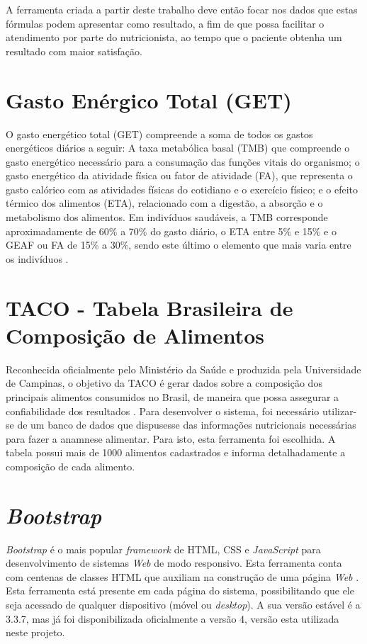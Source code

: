 \documentclass[
	12pt,				%
    oneside,			%
	a4paper,			%
	english,			%
	french,				%
	spanish,			%
	brazil,				%
	]{abntex2}
\begin{document}
A ferramenta criada a partir deste trabalho deve então focar nos dados que estas fórmulas podem apresentar
como resultado, a fim de que possa facilitar o atendimento por parte do nutricionista,
ao tempo que o paciente obtenha um resultado com maior satisfação.


\section{Gasto Enérgico Total (GET)}

O gasto energético total (GET) compreende a soma de todos os gastos energéticos diários a seguir: A
taxa metabólica basal (TMB) que compreende o gasto energético necessário para a
consumação das funções vitais do organismo; o gasto energético da atividade física
ou fator de atividade (FA), que representa o gasto calórico com as atividades físicas
do cotidiano e o exercício físico; e o efeito térmico dos alimentos (ETA), relacionado
com a digestão, a absorção e o metabolismo dos alimentos. Em indivíduos saudáveis,
a TMB corresponde aproximadamente de 60\% a 70\% do gasto diário, o ETA entre 5\% 
e 15\% e o GEAF ou FA de 15\% a 30\%, sendo este último o elemento que mais varia
entre os indivíduos \cite{hill}. 

\section{TACO - Tabela Brasileira de Composição de Alimentos}

Reconhecida oficialmente pelo Ministério da Saúde e produzida pela Universidade de Campinas, o objetivo da TACO é gerar dados sobre a composição dos principais alimentos consumidos no Brasil, de maneira que possa assegurar a confiabilidade dos resultados \cite{taco}. 
Para desenvolver o sistema, foi necessário utilizar-se de um banco de dados que dispusesse das informações nutricionais necessárias para fazer a anamnese alimentar. Para isto, esta ferramenta foi escolhida. A tabela possui mais de 1000 alimentos cadastrados e informa detalhadamente a composição de cada alimento.

\section{\textit{Bootstrap}}

\textit{Bootstrap} é o mais popular \textit{framework} de HTML, CSS e \textit{JavaScript} para desenvolvimento de sistemas \textit{Web} de modo responsivo. Esta ferramenta conta com centenas de classes HTML que auxiliam na construção de uma página \textit{Web} \cite{bootstrap}.
Esta ferramenta está presente em cada página do sistema, possibilitando que ele seja acessado de qualquer dispositivo (móvel ou \textit{desktop}). A sua versão estável é a 3.3.7, mas já foi disponibilizada oficialmente a versão 4, versão esta utilizada neste projeto.
\end{document}
